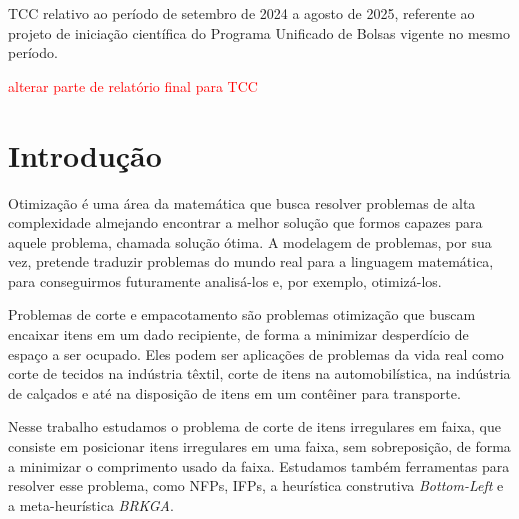 \documentclass[12pt, openright, twoside, a4paper, english, brazilian]{USPSC-classe/USPSC}
\begin{document}
\imprimircapa

\imprimirfolhaderosto

\maketitle

\begin{center}
TCC relativo ao período de setembro de 2024 a agosto de 2025, referente ao projeto de iniciação científica do Programa Unificado de Bolsas vigente no mesmo período.
\end{center}

\textcolor{red}{alterar parte de relatório final para TCC}







\section{Introdução}


Otimização é uma área da matemática que busca resolver problemas de alta complexidade almejando encontrar a melhor solução que formos capazes para aquele problema, chamada solução ótima. A modelagem de problemas, por sua vez, pretende traduzir problemas do mundo real para a linguagem matemática, para conseguirmos futuramente analisá-los e, por exemplo, otimizá-los.

Problemas de corte e empacotamento são problemas otimização que buscam encaixar itens em um dado recipiente, de forma a minimizar desperdício de espaço a ser ocupado. Eles podem ser aplicações de problemas da vida real como corte de tecidos na indústria têxtil, corte de itens na automobilística, na indústria de calçados e até na disposição de itens em um contêiner para transporte. 

Nesse trabalho estudamos o problema de corte de itens irregulares em faixa, que consiste em posicionar itens irregulares em uma faixa, sem sobreposição, de forma a minimizar o comprimento usado da faixa. Estudamos também ferramentas para resolver esse problema, como NFPs, IFPs, a heurística construtiva {\it Bottom-Left} e a meta-heurística {\it BRKGA}.
\end{document}
